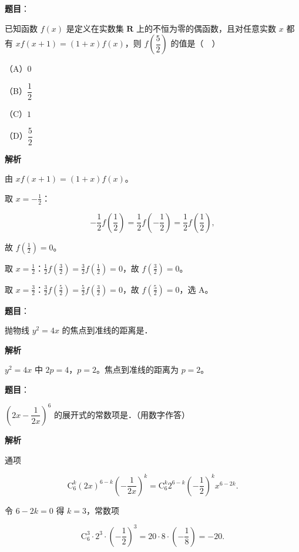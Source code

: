 \begin{answer}

\textbf{题目}：

已知函数 $f(x)$ 是定义在实数集 $\mathbf R$ 上的不恒为零的偶函数，且对任意实数 $x$ 都有 $xf(x+1)=(1+x)f(x)$，则 $f\left(\dfrac52\right)$ 的值是（　）

（A）$0$

（B）$\dfrac12$

（C）$1$

（D）$\dfrac52$

\textbf{解析}

由 $xf(x+1)=(1+x)f(x)$。

取 $x=-\frac12$：

\nopagebreak[4]
\[-\frac12f\left(\frac12\right)=\frac12f\left(-\frac12\right)=\frac12f\left(\frac12\right),\]

故 $f\left(\frac12\right)=0$。

取 $x=\frac12$：$\frac12f\left(\frac32\right)=\frac32f\left(\frac12\right)=0$，故 $f\left(\frac32\right)=0$。

取 $x=\frac32$：$\frac32f\left(\frac52\right)=\frac52f\left(\frac32\right)=0$，故 $f\left(\frac52\right)=0$，选 A。


\end{answer}
\begin{answer}

\textbf{题目}：

抛物线 $y^2=4x$ 的焦点到准线的距离是\gkblank{}．

\textbf{解析}

$y^2=4x$ 中 $2p=4$，$p=2$。焦点到准线的距离为 $p=2$。


\end{answer}
\begin{answer}

\textbf{题目}：

$\left(2x-\dfrac1{2x}\right)^6$ 的展开式的常数项是\gkblank{}．（用数字作答）

\textbf{解析}

通项

\nopagebreak[4]
\[\mathrm C_6^k(2x)^{6-k}\left(-\frac1{2x}\right)^k
=\mathrm C_6^k2^{6-k}\left(-\frac12\right)^k x^{6-2k}.\]

令 $6-2k=0$ 得 $k=3$，常数项

\nopagebreak[4]
\[\mathrm C_6^3\cdot2^3\cdot\left(-\frac12\right)^3=20\cdot8\cdot\left(-\frac18\right)=-20 .\]


\end{answer}
